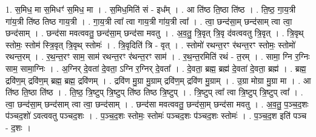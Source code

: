 \documentclass[17pt]{extarticle}
\begin{document}
1. स॒मिध॒ मा स॒मिधꣳ॑ स॒मिध॒ मा । . स॒मिध॒मिति॑ सं - इध᳚म् । . आ ति॑ष्ठ ति॒ष्ठा ति॑ष्ठ । . ति॒ष्ठ॒ गा॒य॒त्री गा॑य॒त्री ति॑ष्ठ तिष्ठ गाय॒त्री । . गा॒य॒त्री त्वा᳚ त्वा गाय॒त्री गा॑य॒त्री त्वा᳚ । . त्वा॒ छन्द॑सा॒म् छन्द॑साम् त्वा त्वा॒ छन्द॑साम् । . छन्द॑सा मवत्ववतु॒ छन्द॑सा॒म् छन्द॑सा मवतु । . अ॒व॒तु॒ त्रि॒वृत् त्रि॒वृ द॑वत्ववतु त्रि॒वृत् । . त्रि॒वृथ् स्तोमः॒ स्तोम॑ स्त्रि॒वृत् त्रि॒वृथ् स्तोमः॑ । . त्रि॒वृदिति॑ त्रि - वृत् । . स्तोमो॑ रथन्त॒रꣳ र॑थन्त॒रꣳ स्तोमः॒ स्तोमो॑ रथन्त॒रम् । . र॒थ॒न्त॒रꣳ साम॒ साम॑ रथन्त॒रꣳ र॑थन्त॒रꣳ साम॑ । . र॒थ॒न्त॒रमिति॑ रथं - त॒रम् । . सामा॒ ग्नि र॒ग्निः साम॒ सामा॒ग्निः । . अ॒ग्निर् दे॒वता॑ दे॒वता॒ ऽग्नि र॒ग्निर् दे॒वता᳚ । . दे॒वता॒ ब्रह्म॒ ब्रह्म॑ दे॒वता॑ दे॒वता॒ ब्रह्म॑ । . ब्रह्म॒ द्रवि॑ण॒म् द्रवि॑ण॒म् ब्रह्म॒ ब्रह्म॒ द्रवि॑णम् । . द्रवि॑ण मु॒ग्रा मु॒ग्राम् द्रवि॑ण॒म् द्रवि॑ण मु॒ग्राम् । . उ॒ग्रा मोग्रा मु॒ग्रा मा । . आ ति॑ष्ठ ति॒ष्ठा ति॑ष्ठ । . ति॒ष्ठ॒ त्रि॒ष्टुप् त्रि॒ष्टुप् ति॑ष्ठ तिष्ठ त्रि॒ष्टुप् । . त्रि॒ष्टुप् त्वा᳚ त्वा त्रि॒ष्टुप् त्रि॒ष्टुप् त्वा᳚ । . त्वा॒ छन्द॑सा॒म् छन्द॑साम् त्वा त्वा॒ छन्द॑साम् । . छन्द॑सा मवत्ववतु॒ छन्द॑सा॒म् छन्द॑सा मवतु । . अ॒व॒तु॒ प॒ञ्च॒द॒शः प॑ञ्चद॒शो॑ ऽवत्ववतु पञ्चद॒शः । . प॒ञ्च॒द॒शः स्तोमः॒ स्तोमः॑ पञ्चद॒शः प॑ञ्चद॒शः स्तोमः॑ । . प॒ञ्च॒द॒श इति॑ पञ्च - द॒शः । \newline
\end{document}
